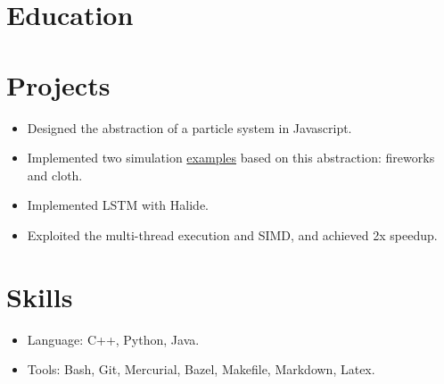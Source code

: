 \documentclass[letterpaper,11pt]{article}
\begin{document}
\section*{Education}
\begin{itemize}
\end{itemize}

\section*{Projects}

\begin{itemize}
  \begin{itemize}
  \item Designed the abstraction of a particle system in Javascript.
  \item Implemented two simulation \href{https://misaka-10032.github.io/particle-system/}{examples} based on this abstraction: fireworks and cloth.
  \end{itemize}
  \begin{itemize}
  \item Implemented LSTM with Halide.
  \item Exploited the multi-thread execution and SIMD, and achieved 2x speedup.
  \end{itemize}
\end{itemize}

\section*{Skills}
\begin{itemize}
\item Language: C++, Python, Java.
\item Tools: Bash, Git, Mercurial, Bazel, Makefile, Markdown, Latex.
\end{itemize}
\end{document}
